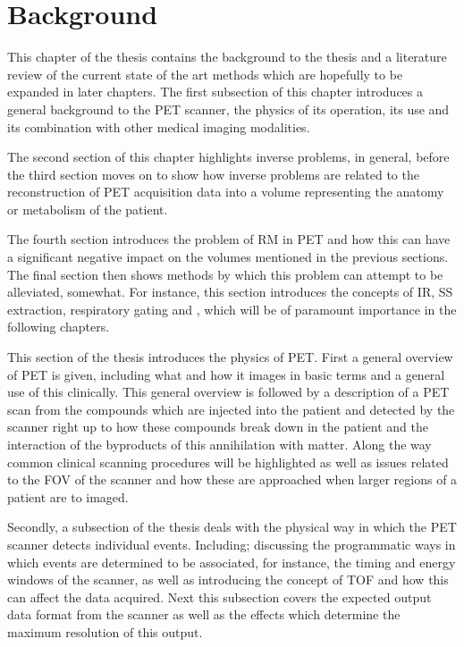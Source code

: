 \chapter{Background} \label{sec:background}
    \newpage
    
        This chapter of the thesis contains the background to the thesis and a literature review of the current state of the art methods which are hopefully to be expanded in later chapters. The first subsection of this chapter introduces a general background to the \gls{PET} scanner, the physics of its operation, its use and its combination with other medical imaging modalities.
        
        The second section of this chapter highlights inverse problems, in general, before the third section moves on to show how inverse problems are related to the reconstruction of \gls{PET} acquisition data into a volume representing the anatomy or metabolism of the patient.
        
        The fourth section introduces the problem of \gls{RM} in \gls{PET} and how this can have a significant negative impact on the volumes mentioned in the previous sections. The final section then shows methods by which this problem can attempt to be alleviated, somewhat. For instance, this section introduces the concepts of \gls{IR}, \gls{SS} extraction, respiratory gating and , which will be of paramount importance in the following chapters.
    
        This section of the thesis introduces the physics of \gls{PET}. First a general overview of \gls{PET} is given, including what and how it images in basic terms and a general use of this clinically. This general overview is followed by a description of a \gls{PET} scan from the compounds which are injected into the patient and detected by the scanner right up to how these compounds break down in the patient and the interaction of the byproducts of this annihilation with matter. Along the way common clinical scanning procedures will be highlighted as well as issues related to the \gls{FOV} of the scanner and how these are approached when larger regions of a patient are to imaged.
            
        Secondly, a subsection of the thesis deals with the physical way in which the \gls{PET} scanner detects individual events. Including; discussing the programmatic ways in which events are determined to be associated, for instance, the timing and energy windows of the scanner, as well as introducing the concept of \gls{TOF} and how this can affect the data acquired. Next this subsection covers the expected output data format from the scanner as well as the effects which determine the maximum resolution of this output.
        
